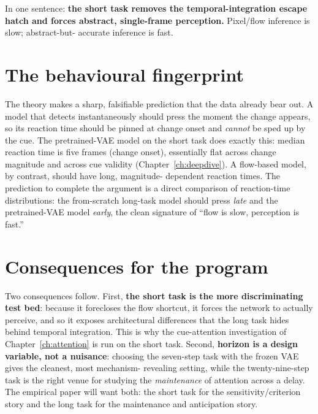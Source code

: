 In one sentence: \textbf{the short task removes the temporal-integration escape hatch and
forces abstract, single-frame perception.} Pixel/flow inference is slow; abstract-but-
accurate inference is fast.

\section{The behavioural fingerprint}
The theory makes a sharp, falsifiable prediction that the data already bear out. A model
that detects instantaneously should press the moment the change appears, so its reaction
time should be pinned at change onset and \emph{cannot} be sped up by the cue. The
pretrained-VAE model on the short task does exactly this: median reaction time is five
frames (change onset), essentially flat across change magnitude and across cue validity
(Chapter~\ref{ch:deepdive}). A flow-based model, by contrast, should have long, magnitude-
dependent reaction times. The prediction to complete the argument is a direct comparison of
reaction-time distributions: the from-scratch long-task model should press \emph{late} and
the pretrained-VAE model \emph{early}, the clean signature of ``flow is slow, perception is
fast.''

\section{Consequences for the program}
Two consequences follow. First, \textbf{the short task is the more discriminating test
bed}: because it forecloses the flow shortcut, it forces the network to actually perceive,
and so it exposes architectural differences that the long task hides behind temporal
integration. This is why the cue-attention investigation of Chapter~\ref{ch:attention} is
run on the short task. Second, \textbf{horizon is a design variable, not a nuisance}:
choosing the seven-step task with the frozen VAE gives the cleanest, most mechanism-
revealing setting, while the twenty-nine-step task is the right venue for studying the
\emph{maintenance} of attention across a delay. The empirical paper will want both: the
short task for the sensitivity/criterion story and the long task for the maintenance and
anticipation story.
